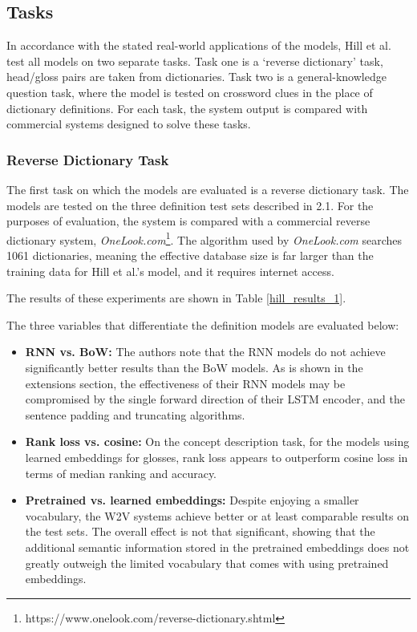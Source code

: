 \documentclass[11pt]{article}
\begin{document}
\begin{spacing}{1}
\subsection{Tasks}
In accordance with the stated real-world applications of the models, Hill et al. \citeyear{hill2015learning} test all models on two separate tasks. Task one is a `reverse dictionary' task, head/gloss pairs are taken from dictionaries. Task two is a general-knowledge question task, where the model is tested on crossword clues in the place of dictionary definitions. For each task, the system output is compared with commercial systems designed to solve these tasks.

\subsubsection{Reverse Dictionary Task}

The first task on which the models are evaluated is a reverse dictionary task. The models are tested on the three definition test sets described in 2.1. For the purposes of evaluation, the system is compared with a commercial reverse dictionary system, \textit{OneLook.com}\footnote{https://www.onelook.com/reverse-dictionary.shtml}. The algorithm used by \textit{OneLook.com} searches 1061 dictionaries, meaning the effective database size is far larger than the training data for Hill et al.'s \citeyear{hill2015learning} model, and it requires internet access.

The results of these experiments are shown in Table \ref{hill_results_1}.

The three variables that differentiate the definition models are evaluated below: 
\begin{itemize}
\item \textbf{RNN vs. BoW:} The authors note that the RNN models do not achieve significantly better results than the BoW models. As is shown in the extensions section, the effectiveness of their RNN models may be compromised by the single forward direction of their LSTM encoder, and the sentence padding and truncating algorithms.
\item \textbf{Rank loss vs. cosine:} On the concept description task, for the models using learned embeddings for glosses, rank loss appears to outperform cosine loss in terms of median ranking and accuracy.
\item \textbf{Pretrained vs. learned embeddings:} Despite enjoying a smaller vocabulary, the W2V systems achieve better or at least comparable results on the test sets. The overall effect is not that significant, showing that the additional semantic information stored in the pretrained embeddings does not greatly outweigh the limited vocabulary that comes with using pretrained embeddings.
\end{itemize}


\end{spacing}
\end{document}
